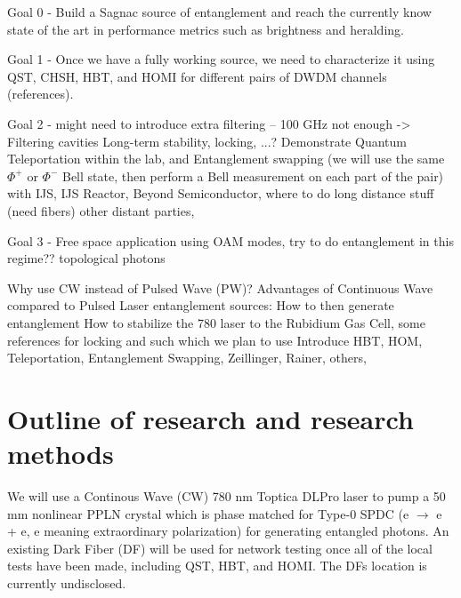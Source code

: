 \documentclass{article}
\theoremstyle{mytheoremstyle}
\theoremstyle{mytheoremstyle}
\theoremstyle{myproblemstyle}
\begin{document}
Goal 0 - Build a Sagnac source of entanglement and reach the currently know state of the art in performance metrics such as brightness and heralding.

Goal 1 - Once we have a fully working source, we need to characterize it using QST, CHSH, HBT, and HOMI for different pairs of DWDM channels (references).

Goal 2 - might need to introduce extra filtering -- 100 GHz not enough -> Filtering cavities
Long-term stability, locking, ...? Demonstrate Quantum Teleportation within the lab, and Entanglement swapping (we will use the same $\Phi^+$ or $\Phi^-$ Bell state,
then perform a Bell measurement on each part of the pair) with IJS, IJS Reactor, Beyond Semiconductor, where to do
long distance stuff (need fibers) other distant parties,

Goal 3 - Free space application using OAM modes, try to do entanglement in this regime?? topological photons

Why use CW instead of Pulsed Wave (PW)?
Advantages of Continuous Wave compared to Pulsed Laser entanglement sources:
How to then generate entanglement
How to stabilize the 780 laser to the Rubidium Gas Cell, some references for locking and such which we plan to use
Introduce HBT, HOM, Teleportation, Entanglement Swapping, Zeillinger, Rainer, others,

\newpage
\section{Outline of research and research methods}
We will use a Continous Wave (CW) 780 nm Toptica DLPro laser to pump a 50 mm nonlinear PPLN crystal which is phase matched for Type-0 SPDC (e $\rightarrow$ e + e, e meaning extraordinary polarization)
for generating entangled photons.
An existing Dark Fiber (DF) will be used for network testing once all of the local tests have been made, including QST, HBT, and HOMI.
The DFs location is currently undisclosed.

\newpage
\end{document}

